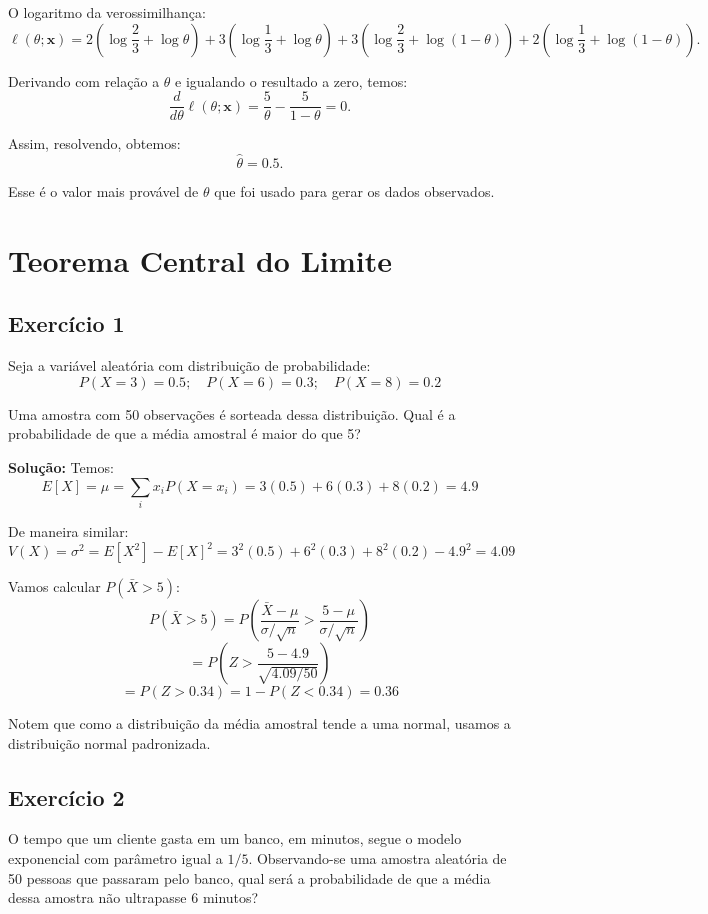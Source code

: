 \documentclass{article}
\begin{document}
O logaritmo da verossimilhança:
    $$
    \ell(\theta; \mathbf{x}) = 
    2\left(\log\frac{2}{3} + \log\theta\right) +
    3\left(\log\frac{1}{3} + \log\theta\right) +
    3\left(\log\frac{2}{3} + \log(1-\theta)\right) +
    2\left(\log\frac{1}{3} + \log(1-\theta)\right).
    $$

Derivando com relação a $\theta$ e igualando o resultado a zero, temos:
    $$
    \frac{d}{d\theta}\ell(\theta; \mathbf{x}) = 
    \frac{5}{\theta} - \frac{5}{1-\theta} = 0.
    $$
    
Assim, resolvendo, obtemos:
    $$
    \hat{\theta} = 0.5.
    $$

Esse é o valor mais provável de $\theta$ que foi usado para gerar os dados observados.

\section{Teorema Central do Limite}
\subsection{Exercício 1}
Seja a variável aleatória com distribuição de probabilidade:
    $$
    P(X = 3) = 0.5; \quad P(X = 6) = 0.3; \quad P(X = 8) = 0.2
    $$
    
Uma amostra com 50 observações é sorteada dessa distribuição.
Qual é a probabilidade de que a média amostral é maior do que 5?

\vspace{0.5cm}
\textbf{Solução:} 
Temos:
    $$
    E[X] = \mu = \sum_i x_i P(X = x_i) = 3(0.5) + 6(0.3) + 8(0.2) = 4.9
    $$

De maneira similar:
    $$
    V(X) = \sigma^2 = E[X^2] - E[X]^2 = 3^2(0.5) + 6^2(0.3) + 8^2(0.2) - 4.9^2 = 4.09
    $$

Vamos calcular $P(\bar{X} > 5)$:
    $$
    P(\bar{X} > 5) = P\left(\frac{\bar{X} - \mu}{\sigma / \sqrt{n}} > \frac{5 - \mu}{\sigma / \sqrt{n}}\right)
    $$
    $$
    = P\left(Z > \frac{5 - 4.9}{\sqrt{4.09 / 50}}\right)
    $$
    $$
    = P(Z > 0.34) = 1 - P(Z < 0.34) = 0.36
    $$

Notem que como a distribuição da média amostral tende a uma normal, usamos a distribuição normal padronizada.

\subsection{Exercício 2}
O tempo que um cliente gasta em um banco, em minutos, segue o modelo exponencial com parâmetro igual a $1/5$. Observando-se uma amostra aleatória de 50 pessoas que passaram pelo banco, qual será a probabilidade de que a média dessa amostra não ultrapasse 6 minutos?
\end{document}
